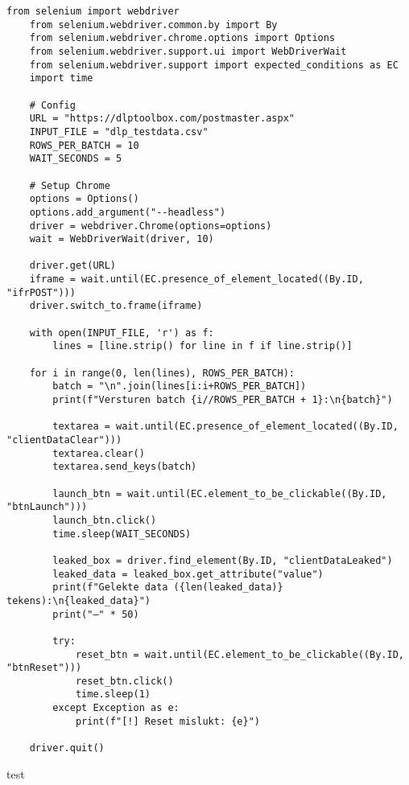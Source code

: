 \begin{lstlisting}[style=custompython,caption={Selenium-script voor batchgewijze verzending van testdata},label={lst:dlp-script}, captionpos=b]
    from selenium import webdriver
    from selenium.webdriver.common.by import By
    from selenium.webdriver.chrome.options import Options
    from selenium.webdriver.support.ui import WebDriverWait
    from selenium.webdriver.support import expected_conditions as EC
    import time
    
    # Config
    URL = "https://dlptoolbox.com/postmaster.aspx"
    INPUT_FILE = "dlp_testdata.csv"
    ROWS_PER_BATCH = 10
    WAIT_SECONDS = 5
    
    # Setup Chrome
    options = Options()
    options.add_argument("--headless")
    driver = webdriver.Chrome(options=options)
    wait = WebDriverWait(driver, 10)
    
    driver.get(URL)
    iframe = wait.until(EC.presence_of_element_located((By.ID, "ifrPOST")))
    driver.switch_to.frame(iframe)
    
    with open(INPUT_FILE, 'r') as f:
        lines = [line.strip() for line in f if line.strip()]
    
    for i in range(0, len(lines), ROWS_PER_BATCH):
        batch = "\n".join(lines[i:i+ROWS_PER_BATCH])
        print(f"Versturen batch {i//ROWS_PER_BATCH + 1}:\n{batch}")
    
        textarea = wait.until(EC.presence_of_element_located((By.ID, "clientDataClear")))
        textarea.clear()
        textarea.send_keys(batch)
    
        launch_btn = wait.until(EC.element_to_be_clickable((By.ID, "btnLaunch")))
        launch_btn.click()
        time.sleep(WAIT_SECONDS)
    
        leaked_box = driver.find_element(By.ID, "clientDataLeaked")
        leaked_data = leaked_box.get_attribute("value")
        print(f"Gelekte data ({len(leaked_data)} tekens):\n{leaked_data}")
        print("—" * 50)
    
        try:
            reset_btn = wait.until(EC.element_to_be_clickable((By.ID, "btnReset")))
            reset_btn.click()
            time.sleep(1)
        except Exception as e:
            print(f"[!] Reset mislukt: {e}")
    
    driver.quit()
\end{lstlisting}

test

